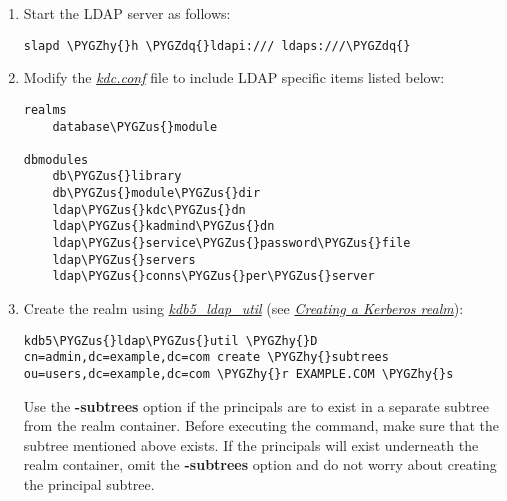 \documentclass[letterpaper,10pt,english]{sphinxmanual}
\def\PYGZus{\char`\_}
\def\PYGZsh{\char`\#}
\def\PYGZhy{\char`\-}
\def\PYGZdq{\char`\"}
\begin{document}
\begin{enumerate}
\begin{Verbatim}[commandchars=\\\{\}]
\PYGZsh{} Providing access to principals, if not underneath realm container
access to dn.subtree= \PYGZdq{}ou=users,dc=example,dc=com\PYGZdq{}
    by dn.exact=\PYGZdq{}cn=kdc\PYGZhy{}service,dc=example,dc=com\PYGZdq{} read
    by dn.exact=\PYGZdq{}cn=adm\PYGZhy{}service,dc=example,dc=com\PYGZdq{} write
    by * none

access to *
    by * read
\end{Verbatim}

If the locations of the container and principals or the DNs of
the service objects for a realm are changed then this
information should be updated.

\item {} 
Start the LDAP server as follows:

\begin{Verbatim}[commandchars=\\\{\}]
slapd \PYGZhy{}h \PYGZdq{}ldapi:/// ldaps:///\PYGZdq{}
\end{Verbatim}

\item {} 
Modify the {\hyperref[admin/conf_files/kdc_conf:kdc-conf-5]{\emph{kdc.conf}}} file to include LDAP specific items
listed below:

\begin{Verbatim}[commandchars=\\\{\}]
realms
    database\PYGZus{}module

dbmodules
    db\PYGZus{}library
    db\PYGZus{}module\PYGZus{}dir
    ldap\PYGZus{}kdc\PYGZus{}dn
    ldap\PYGZus{}kadmind\PYGZus{}dn
    ldap\PYGZus{}service\PYGZus{}password\PYGZus{}file
    ldap\PYGZus{}servers
    ldap\PYGZus{}conns\PYGZus{}per\PYGZus{}server
\end{Verbatim}

\item {} 
Create the realm using {\hyperref[admin/admin_commands/kdb5_ldap_util:kdb5-ldap-util-8]{\emph{kdb5\_ldap\_util}}} (see
{\hyperref[admin/database:ldap-create-realm]{\emph{Creating a Kerberos realm}}}):

\begin{Verbatim}[commandchars=\\\{\}]
kdb5\PYGZus{}ldap\PYGZus{}util \PYGZhy{}D cn=admin,dc=example,dc=com create \PYGZhy{}subtrees ou=users,dc=example,dc=com \PYGZhy{}r EXAMPLE.COM \PYGZhy{}s
\end{Verbatim}

Use the \textbf{-subtrees} option if the principals are to exist in a
separate subtree from the realm container.  Before executing the
command, make sure that the subtree mentioned above
 exists.  If the principals will
exist underneath the realm container, omit the \textbf{-subtrees} option
and do not worry about creating the principal subtree.


\end{enumerate}
\end{document}
